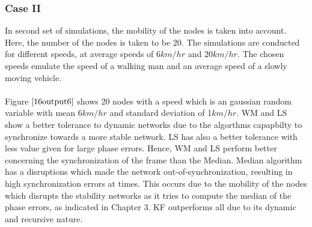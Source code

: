 \documentclass[a4paper,10pt]{report}
\begin{document}
\subsubsection{\textbf{Case II}}
In second set of simulations, the mobility of the nodes is taken
into account. Here, the number of the nodes is taken to be $20$. The
simulations are conducted for different speeds, at average speeds of
$6km/hr$ and $20km/hr$. The chosen speeds emulate the speed of a
walking man and an average speed of a slowly moving vehicle.
\paragraph*{}
Figure $\ref{16output6}$ shows 20 nodes with a speed which is an
gaussian random variable with mean $6km/hr$ and standard deviation
of 1$km/hr$. WM and LS show a better tolerance to dynamic networks
due to the algorthms capapbilty to synchronize towards a more stable
network. LS has also a better tolerance with less value given for
large phase errors. Hence, WM and LS perform better concerning the
synchronization of the frame than the Median.  Median algorithm has
a disruptions which made the network out-of-synchronization,
resulting in high synchronization errors at times. This occurs due
to the mobility of the nodes which disrupts the stability networks
as it tries to compute the median of the phase errors, as indicated
in Chapter 3. KF outperforms all due to its dynamic and recursive nature.
\end{document}
